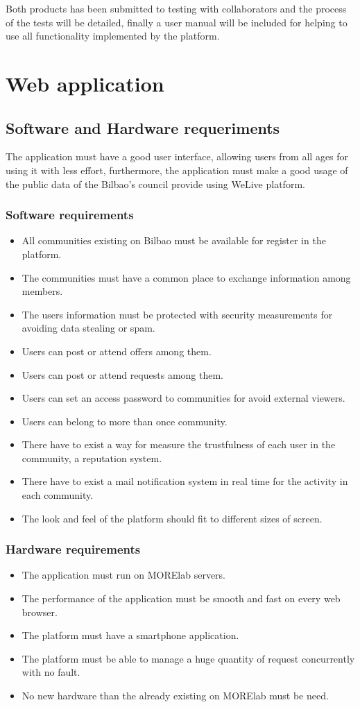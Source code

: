 \documentclass{DeustoFDP}
\begin{document}
Both products has been submitted to testing with collaborators and the process of the tests will be detailed, finally a user manual will be included for helping to use all functionality implemented by the platform.
\section{Web application}
\subsection{Software and Hardware requeriments}
The application must have a good user interface, allowing users from all ages for using it with less effort, furthermore, the application must make a good usage of the public data of the Bilbao's council provide using WeLive platform.

\subsubsection{Software requirements}
\begin{itemize}
	\item All communities existing on Bilbao must be available for register in the platform.
	\item The communities must have a common place to exchange information among members.
	\item The users information must be protected with security measurements for avoiding data stealing or spam.
	\item Users can post or attend offers among them.
	\item Users can post or attend requests among them.
	\item Users can set an access password to communities for avoid external viewers.
	\item Users can belong to more than once community.
	\item There have to exist a way for measure the trustfulness of each user in the community, a reputation system.
	\item There have to exist a mail notification system in real time for the activity in each community.
	\item The look and feel of the platform should fit to different sizes of screen.
\end{itemize}

\subsubsection{Hardware requirements}
\begin{itemize}
	\item The application must run on MORElab servers.
	\item The performance of the application must be smooth and fast on every web browser.
	\item The platform must have a smartphone application.
	\item The platform must be able to manage a huge quantity of request concurrently with no fault.
	\item No new hardware than the already existing on MORElab must be need.
\end{itemize}
\end{document}
